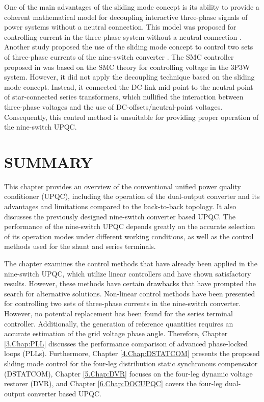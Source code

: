 One of the main advantages of the sliding mode concept is its ability to provide a coherent mathematical model for decoupling interactive three-phase signals of power systems without a neutral connection. This model was proposed for controlling current in the three-phase system without a neutral connection \cite{4455458}. Another study proposed the use of the sliding mode concept to control two sets of three-phase currents of the nine-switch converter \cite{6563653}. The SMC controller proposed in \cite{1489536} was based on the SMC theory for controlling voltage in the 3P3W system. However, it did not apply the decoupling technique based on the sliding mode concept. Instead, it connected the DC-link mid-point to the neutral point of star-connected series transformers, which nullified the interaction between three-phase voltages and the use of DC-offsets/neutral-point voltages. Consequently, this control method is unsuitable for providing proper operation of the nine-switch UPQC.

\section{SUMMARY} 
This chapter provides an overview of the conventional unified power quality conditioner (UPQC), including the operation of the dual-output converter and its advantages and limitations compared to the back-to-back topology. It also discusses the previously designed nine-switch converter based UPQC. The performance of the nine-switch UPQC depends greatly on the accurate selection of its operation modes under different working conditions, as well as the control methods used for the shunt and series terminals.

The chapter examines the control methods that have already been applied in the nine-switch UPQC, which utilize linear controllers and have shown satisfactory results. However, these methods have certain drawbacks that have prompted the search for alternative solutions. Non-linear control methods have been presented for controlling two sets of three-phase currents in the nine-switch converter. However, no potential replacement has been found for the series terminal controller. Additionally, the generation of reference quantities requires an accurate estimation of the grid voltage phase angle. Therefore, Chapter \ref{3.Chap:PLL} discusses the performance comparison of advanced phase-locked loops (PLLs). Furthermore, Chapter \ref{4.Chap:DSTATCOM} presents the proposed sliding mode control for the four-leg distribution static synchronous compensator (DSTATCOM), Chapter \ref{5.Chap:DVR} focuses on the four-leg dynamic voltage restorer (DVR), and Chapter \ref{6.Chap:DOCUPQC} covers the four-leg dual-output converter based UPQC.